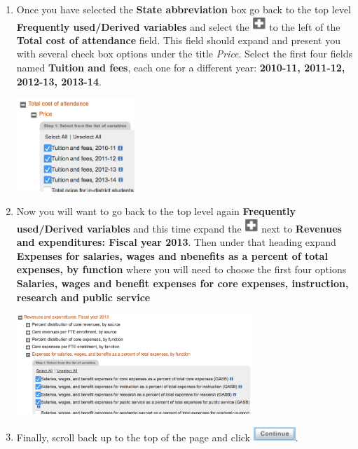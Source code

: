 \documentclass{article}
\begin{document}
{\begin{enumerate}[leftmargin=15mm]
\item Once you have selected the \textbf{State abbreviation} box go back to the top level \textbf{Frequently used/Derived variables} and select the \includegraphics[width=0.04\textwidth]{plus.png} to the left of the \textbf{Total cost of attendance} field.  This field should expand and present you with several check box options under the title \textit{Price}.  Select the first four fields named \textbf{Tuition and fees}, each one for a different year: \textbf{2010-11, 2011-12, 2012-13, 2013-14}. \begin{flushright} \includegraphics[width=0.35\textwidth]{cost.png} \end{flushright}

\item Now you will want to go back to the top level again \textbf{Frequently used/Derived variables} and this time expand the \includegraphics[width=0.04\textwidth]{plus.png} next to \textbf{Revenues and expenditures: Fiscal year 2013}.  Then under that heading expand \textbf{Expenses for salaries, wages and nbenefits as a percent of total expenses, by function} where you will need to choose the first four options \textbf{Salaries, wages and benefit expenses for core expenses, instruction, research and public service} \begin{flushright}\includegraphics[width=0.7\textwidth]{core.png} \end{flushright}

\item Finally, scroll back up to the top of the page and click \includegraphics[width=0.125\textwidth]{continue2.png}.


\end{enumerate}}
\end{document}
